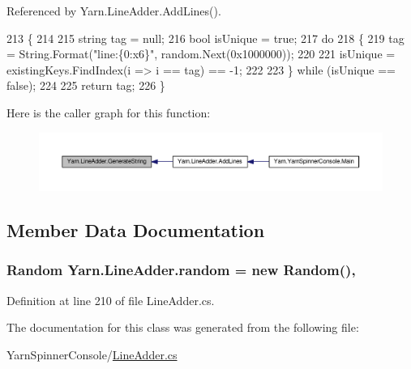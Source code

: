 Referenced by Yarn.\-Line\-Adder.\-Add\-Lines().


\begin{DoxyCode}
213                                                                 \{
214 
215             \textcolor{keywordtype}{string} tag = null;
216             \textcolor{keywordtype}{bool} isUnique = \textcolor{keyword}{true};
217             \textcolor{keywordflow}{do}
218             \{
219                 tag = String.Format(\textcolor{stringliteral}{"line:\{0:x6\}"}, random.Next(0x1000000));
220 
221                 isUnique = existingKeys.FindIndex(i => i == tag) == -1;
222 
223             \} \textcolor{keywordflow}{while} (isUnique == \textcolor{keyword}{false});
224 
225             \textcolor{keywordflow}{return} tag;
226         \}
\end{DoxyCode}


Here is the caller graph for this function\-:
\nopagebreak
\begin{figure}[H]
\begin{center}
\leavevmode
\includegraphics[width=350pt]{a00124_a91ad68b679bd3b0bd89fe92ea5068688_icgraph}
\end{center}
\end{figure}




\subsection{Member Data Documentation}
\hypertarget{a00124_ad887744b1b813fc081be814958742c37}{
\subsubsection[{random}]{\setlength{\rightskip}{0pt plus 5cm}Random Yarn.\-Line\-Adder.\-random = new Random()\hspace{0.3cm}{\ttfamily [static]}, {\ttfamily [private]}}}\label{a00124_ad887744b1b813fc081be814958742c37}


Definition at line 210 of file Line\-Adder.\-cs.



The documentation for this class was generated from the following file\-:\begin{DoxyCompactItemize}
\item 
Yarn\-Spinner\-Console/\hyperlink{a00312}{Line\-Adder.\-cs}\end{DoxyCompactItemize}

